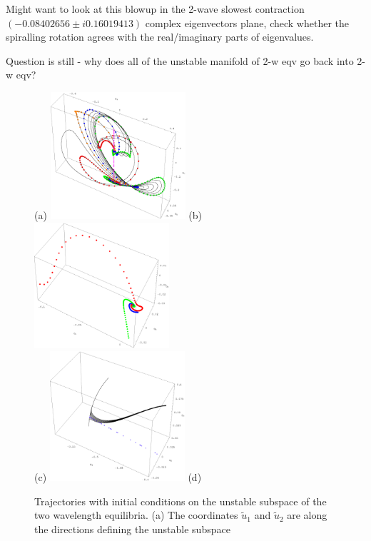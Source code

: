 Might want to look at this blowup in
the 2-wave slowest contraction
$   ( -0.08402656 \pm i 0.16019413)$
complex eigenvectors plane, check whether the
spiralling rotation agrees with the real/imaginary parts of eigenvalues.

Question is still - why does all of the unstable manifold of 2-w eqv go back
into 2-w eqv?

\begin{figure}[h]
\centering
(a) \includegraphics[width=5.0cm]{figs/L22-2w-UnsMan.eps}
\hspace{0.1in}
(b) \includegraphics[width=5.0cm]{figs/L22-2w-UnsMan-BlowUp.eps}
\\
(c) \includegraphics[width=5.0cm]{figs/L22-2w-3w-UnsMan.eps}
\hspace{0.1in}
(d) %
\caption{
 Trajectories with initial conditions on the unstable subspace of
 the two wavelength equilibria.  
 (a) The coordinates $\tilde{u}_1$ and $\tilde{u}_2$ are along the directions defining the unstable subspace
}
\end{figure}
